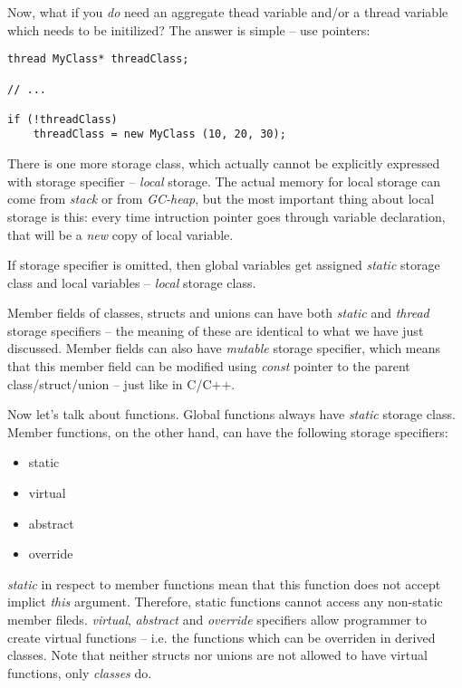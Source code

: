 \documentclass[oneside]{book}
\begin{document}
Now, what if you \emph{do} need an aggregate thead variable and/or a thread variable which needs to be initilized? The answer is simple -- use pointers:

\begin{lstlisting}
thread MyClass* threadClass;

// ...

if (!threadClass)
	threadClass = new MyClass (10, 20, 30);
\end{lstlisting}

There is one more storage class, which actually cannot be explicitly expressed with storage specifier -- \emph{local} storage. The actual memory for local storage can come from \emph{stack} or from \emph{GC-heap}, but the most important thing about local storage is this: every time intruction pointer goes through variable declaration, that will be a \emph{new} copy of local variable.

If storage specifier is omitted, then global variables get assigned \emph{static} storage class and local variables -- \emph{local} storage class.

Member fields of classes, structs and unions can have both \emph{static} and \emph{thread} storage specifiers -- the meaning of these are identical to what we have just discussed. Member fields can also have \emph{mutable} storage specifier, which means that this member field can be modified using \emph{const} pointer to the parent class/struct/union -- just like in C/C++.

Now let's talk about functions. Global functions always have \emph{static} storage class. Member functions, on the other hand, can have the following storage specifiers:

\begin{itemize}
\item static
\item virtual
\item abstract
\item override
\end{itemize}

\emph{static} in respect to member functions mean that this function does not accept implict \emph{this} argument. Therefore, static functions cannot access any non-static member fileds. \emph{virtual}, \emph{abstract} and \emph{override} specifiers allow programmer to create virtual functions -- i.e. the functions which can be overriden in derived classes. Note that neither structs nor unions are not allowed to have virtual functions, only \emph{classes} do.
\end{document}
